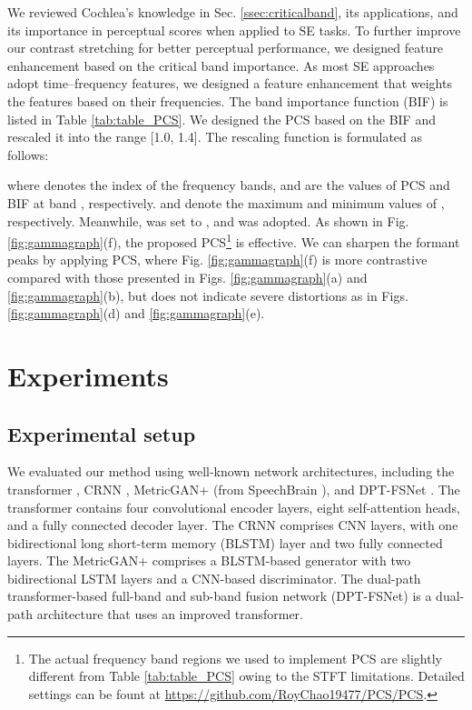 \documentclass[a4paper]{article}
\begin{document}
We reviewed Cochlea's knowledge in Sec. \ref{ssec:criticalband}, its applications, and its importance in perceptual scores when applied to SE tasks. To further improve our contrast stretching for better perceptual performance, we designed feature enhancement based on the critical band importance. As most SE approaches adopt time–frequency features, we designed a feature enhancement that weights the features based on their frequencies. The band importance function (BIF) \cite{ansi1997s3} is listed in Table \ref{tab:table_PCS}. We designed the PCS based on the BIF and rescaled it into the range [1.0, 1.4]. The rescaling function is formulated as follows:

where  denotes the index of the frequency bands,  and  are the  values of PCS and BIF at band , respectively.  and  denote the maximum and minimum values of , respectively. Meanwhile,  was set to , and  was adopted. As shown in Fig. \ref{fig:gammagraph}(f), the proposed PCS\footnote{The actual frequency band regions we used to implement PCS are slightly different from Table \ref{tab:table_PCS} owing to the STFT limitations. Detailed settings can be fount at \url{https://github.com/RoyChao19477/PCS/PCS}.} is effective. We can sharpen the formant peaks by applying PCS, where Fig. \ref{fig:gammagraph}(f) is more contrastive compared with those presented in Figs. \ref{fig:gammagraph}(a) and \ref{fig:gammagraph}(b), but does not indicate severe distortions as in Figs. \ref{fig:gammagraph}(d) and \ref{fig:gammagraph}(e).


\section{Experiments}
\label{sec:exp}


\subsection{Experimental setup}
\label{ssec:network}

We evaluated our method using well-known network architectures, including the transformer \cite{fu2020boosting}, CRNN \cite{zhao2018convolutional}, MetricGAN+ \cite{fu2021metricgan+} (from SpeechBrain \cite{ravanelli2021speechbrain}), and DPT-FSNet \cite{dang2021dpt}. The transformer contains four convolutional encoder layers, eight self-attention heads, and a fully connected decoder layer. The CRNN comprises CNN layers, with one bidirectional long short-term memory (BLSTM) layer and two fully connected layers. The MetricGAN+ comprises a BLSTM-based generator with two bidirectional LSTM layers and a CNN-based discriminator. The dual-path transformer-based full-band and sub-band fusion network (DPT-FSNet) is a dual-path architecture that uses an improved transformer.
\end{document}
